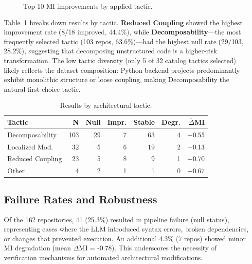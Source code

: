 \documentclass[sigconf,review,anonymous]{acmart}
\begin{document}
\begin{figure}[htbp]
    \centering
    \resizebox{0.5\textwidth}{!}{}
    \caption{Top 10 MI improvements by applied tactic.}
    \label{fig:top10_shifts}
\end{figure}

Table~\ref{tab:tactic} breaks down results by tactic. \textbf{Reduced Coupling} showed the highest improvement rate (8/18 improved, 44.4\%), while \textbf{Decomposability}---the most frequently selected tactic (103 repos, 63.6\%)---had the highest null rate (29/103, 28.2\%), suggesting that decomposing unstructured code is a higher-risk transformation. The low tactic diversity (only 5 of 32 catalog tactics selected) likely reflects the dataset composition: Python backend projects predominantly exhibit monolithic structure or loose coupling, making Decomposability the natural first-choice tactic.

\begin{table}[htbp]
\caption{Results by architectural tactic.}
\label{tab:tactic}
\centering
\small
\begin{tabular}{lrrrrrr}
\toprule
\textbf{Tactic} & \textbf{N} & \textbf{Null} & \textbf{Impr.} & \textbf{Stable} & \textbf{Degr.} & \textbf{$\overline{\Delta}$MI} \\
\midrule
Decomposability & 103 & 29 & 7 & 63 & 4 & +0.55 \\
Localized Mod. & 32 & 5 & 6 & 19 & 2 & +0.13 \\
Reduced Coupling & 23 & 5 & 8 & 9 & 1 & +0.70 \\
Other & 4 & 2 & 1 & 1 & 0 & +0.67 \\
\bottomrule
\end{tabular}
\end{table}

\subsection{Failure Rates and Robustness}
Of the 162 repositories, 41 (25.3\%) resulted in pipeline failure (null status), representing cases where the LLM introduced syntax errors, broken dependencies, or changes that prevented execution. An additional 4.3\% (7 repos) showed minor MI degradation (mean $\Delta$MI = -0.78). This underscores the necessity of verification mechanisms for automated architectural modifications.
\end{document}
